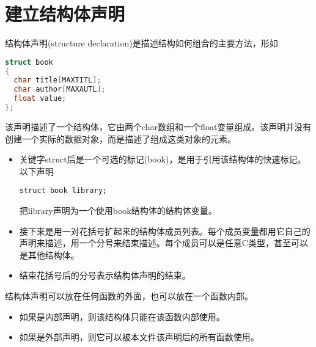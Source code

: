 \section{建立结构体声明}
\begin{frame}[fragile]\ft{\secname}
  结构体声明{\tf (structure declaration)}是描述结构如何组合的主要方法，形如
  \begin{lstlisting}[language=c,backgroundcolor=\color{red!20}]
struct book
{
  char title[MAXTITL];
  char author[MAXAUTL];
  float value;
};    
  \end{lstlisting}
该声明描述了一个结构体，它由两个{\tf char}数组和一个{\tf float}变量组成。该声明并没有创建一个实际的数据对象，而是描述了组成这类对象的元素。  
\end{frame}

\begin{frame}[fragile]\ft{\secname}
  \begin{itemize}
  \item 关键字{\tf struct}后是一个可选的标记{\tf (book)}，是用于引用该结构体的快速标记。以下声明
  \begin{lstlisting}[basicstyle=\ttfamily]
struct book library;
  \end{lstlisting}
把{\tf library}声明为一个使用{\tf book}结构体的结构体变量。 \\[0.1in]
\item 接下来是用一对花括号扩起来的结构体成员列表。每个成员变量都用它自己的声明来描述，用一个分号来结束描述。每个成员可以是任意C类型，甚至可以是其他结构体。 \\[0.1in]
\item 结束花括号后的分号表示结构体声明的结束。
  \end{itemize}
\end{frame}

\begin{frame}[fragile]\ft{\secname}
  结构体声明可以放在任何函数的外面，也可以放在一个函数内部。
  \begin{itemize}
  \item 
    如果是内部声明，则该结构体只能在该函数内部使用。\\[0.1in]
  \item
    如果是外部声明，则它可以被本文件该声明后的所有函数使用。
  \end{itemize}
\end{frame}

